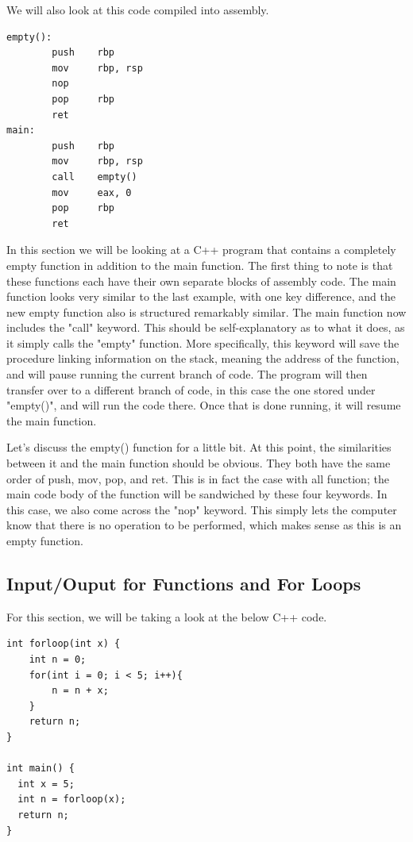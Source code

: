 \documentclass{article}
\theoremstyle{theorem}
\theoremstyle{definition}
\theoremstyle{remark}
\begin{document}
We will also look at this code compiled into assembly.

\begin{lstlisting}
empty():
        push    rbp
        mov     rbp, rsp
        nop
        pop     rbp
        ret
main:
        push    rbp
        mov     rbp, rsp
        call    empty()
        mov     eax, 0
        pop     rbp
        ret
\end{lstlisting}

In this section we will be looking at a C++ program that contains a completely empty function in addition to the main function. The first thing to note is that these functions each have their own separate blocks of assembly code. The main function looks very similar to the last example, with one key difference, and the new empty function also is structured remarkably similar. The main function now includes the "call" keyword. This should be self-explanatory as to what it does, as it simply calls the "empty" function. More specifically, this keyword will save the procedure linking information on the stack, meaning the address of the function, and will pause running the current branch of code. The program will then transfer over to a different branch of code, in this case the one stored under "empty()", and will run the code there. Once that is done running, it will resume the main function.

Let's discuss the empty() function for a little bit. At this point, the similarities between it and the main function should be obvious. They both have the same order of push, mov, pop, and ret. This is in fact the case with all function; the main code body of the function will be sandwiched by these four keywords. In this case, we also come across the "nop" keyword. This simply lets the computer know that there is no operation to be performed, which makes sense as this is an empty function.

\subsection{Input/Ouput for Functions and For Loops}

For this section, we will be taking a look at the below C++ code.

\begin{lstlisting}
int forloop(int x) {
    int n = 0;
    for(int i = 0; i < 5; i++){
        n = n + x;
    }
    return n;
}

int main() {
  int x = 5;
  int n = forloop(x);
  return n;
}
\end{lstlisting}
\end{document}
